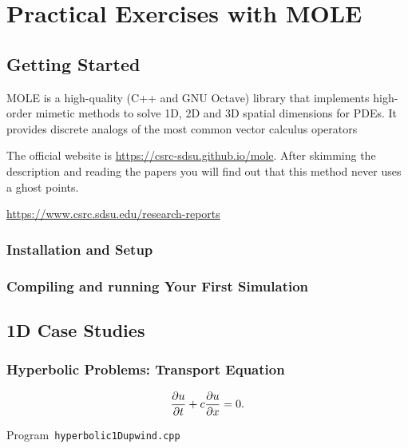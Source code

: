 \part{Practical Exercises with MOLE}

\chapter{Getting Started}

MOLE is a high-quality (C++ and GNU Octave) library that
implements high-order mimetic methods to solve 1D, 2D and 3D
spatial dimensions for PDEs.
It provides discrete analogs of the most common vector calculus
operators

The official website is \url{https://csrc-sdsu.github.io/mole}.
After skimming the description and reading the papers you will find
out that this method never uses a ghost points.

\url{https://www.csrc.sdsu.edu/research-reports}

\section{Installation and Setup}

\section{Compiling and running Your First Simulation}


\chapter{1D Case Studies}

\section{Hyperbolic Problems: Transport Equation}

\begin{equation*}
    \diffp{u}{t}+c\diffp{u}{x}=
    0.
\end{equation*}

\begin{listing}[ht!]
    \tiny
    \centering
    \caption{Program~\texttt{hyperbolic1Dupwind.cpp}}
    \label{code:hyperbolic1Dupwind.cpp}
\end{listing}

